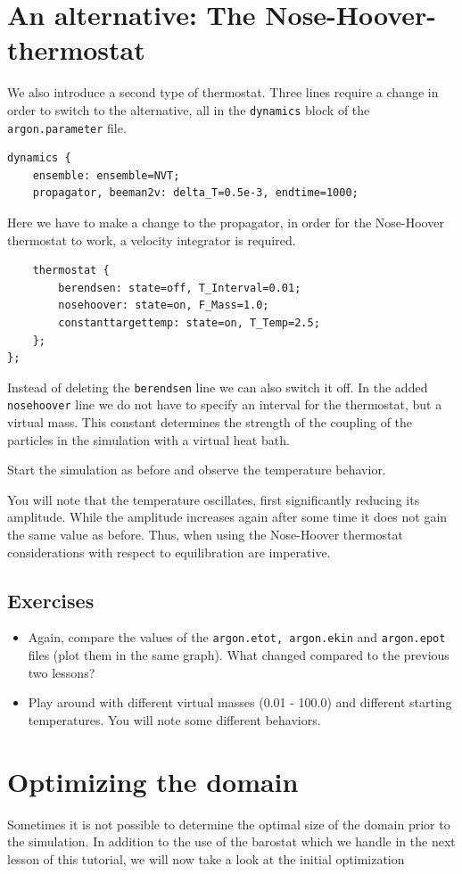 \section{An alternative: The Nose-Hoover-thermostat}
We also introduce a second type of thermostat. Three lines require a change in order to switch to the alternative, all in the \texttt{dynamics} block of the \texttt{argon.parameter} file.
\begin{lstlisting}
dynamics {
    ensemble: ensemble=NVT;
    propagator, beeman2v: delta_T=0.5e-3, endtime=1000;
\end{lstlisting}
Here we have to make a change to the propagator, in order for the Nose-Hoover thermostat to work, a velocity integrator is required.
\begin{lstlisting}
    thermostat {
        berendsen: state=off, T_Interval=0.01;
        nosehoover: state=on, F_Mass=1.0;
        constanttargettemp: state=on, T_Temp=2.5;
    };
};
\end{lstlisting}
Instead of deleting the \texttt{berendsen} line we can also switch it off.
In the added \texttt{nosehoover} line we do not have to specify an interval
for the thermostat, but a virtual mass. This constant determines the strength
of the coupling of the particles in the simulation with a virtual heat bath.

Start the simulation as before and observe the temperature behavior.

You will note that the temperature oscillates, first significantly reducing
its amplitude. While the amplitude increases again after some time it does
not gain the same value as before. Thus, when using the Nose-Hoover thermostat
considerations with respect to equilibration are imperative.

\subsection{Exercises}
\begin{itemize}
\item Again, compare the values of the \texttt{argon.etot, argon.ekin} and \texttt{argon.epot} files (plot them in the same graph). What changed compared to the previous two lessons?
\item Play around with different virtual masses (0.01 - 100.0) and different starting temperatures. You will note some different behaviors.
\end{itemize}


\section{Optimizing the domain}
\label{sec:domain_opt}
Sometimes it is not possible to determine the optimal size of the domain
prior to the simulation. In addition to the use of the barostat which we
handle in the next lesson of this tutorial, we will now take a look at the
initial optimization

